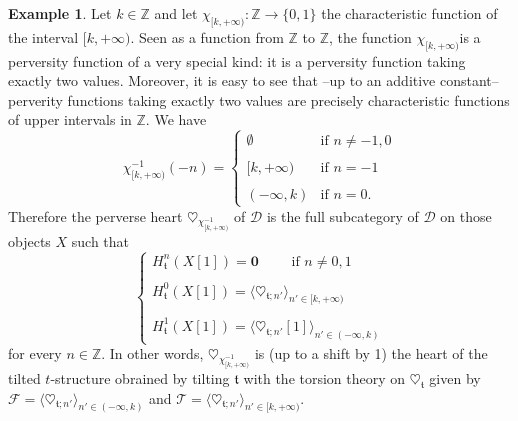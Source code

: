 \documentclass{article}
\theoremstyle{definition}
\newtheorem{exmp}[thm]{Example}
\newcommand{\Z}{\mathbb{Z}}
\newcommand{\tee}{\mathfrak{t}}
\begin{document}
\begin{exmp}
Let $k\in \Z$ and let $\chi_{[k,+\infty)}\colon \Z\to \{0,1\}$ the characteristic function of the interval $[k,+\infty)$. Seen as a function from $\Z$ to $\Z$, the function $\chi_{[k,+\infty)}$is a perversity function of a very special kind: it is a perversity function taking exactly two values. Moreover, it is easy to see that --up to an additive constant-- perverity functions taking exactly two values are precisely characteristic functions of upper intervals in $\Z$. We have
\[
\chi_{[k,+\infty)}^{-1}(-n)=\begin{cases}
\emptyset &\text{if }n\neq -1,0\\
\\
[k,+\infty)&\text{if }n= -1\\
\\
(-\infty,k)&\text{if }n =0.
\end{cases}
\]
Therefore the perverse heart $\heartsuit_{\chi_{[k,+\infty)}^{-1}}$ of $\mathscr{D}$ is the full subcategory of $\mathscr{D}$ on those objects $X$ such that 
\[
\begin{cases}
H_\tee^{n}(X[1])= \mathbf{0} \qquad \text{ if }n\neq 0,1 \\
\\
H_\tee^{0}(X[1])= \langle \heartsuit_{\tee;n'}\rangle_{n'\in [k,+\infty)}\\
\\
H_\tee^{1}(X[1])= \langle \heartsuit_{\tee;n'}[1]\rangle_{n'\in (-\infty,k)}
\end{cases}
\]
for every $n\in \Z$. In other words, $\heartsuit_{\chi_{[k,+\infty)}^{-1}}$ is (up to a shift by 1) the heart of the tilted $t$-structure obrained by tilting $\tee$ with the torsion theory on $\heartsuit_\tee$ given by $\mathcal{F}=\langle \heartsuit_{\tee;n'}\rangle_{n'\in (-\infty,k)}$ and $\mathcal{T}=\langle \heartsuit_{\tee;n'}\rangle_{n'\in [k,+\infty)}$.
\end{exmp}
\end{document}
